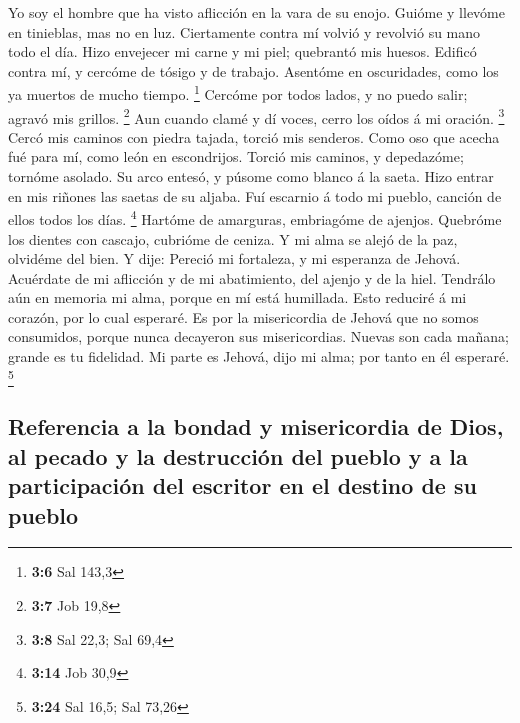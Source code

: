  Yo soy el hombre que ha visto aflicción en la vara de su
enojo.  Guióme y llevóme en tinieblas, mas no en luz.
 Ciertamente contra mí volvió y revolvió su mano todo el
día.  Hizo envejecer mi carne y mi piel; quebrantó mis
huesos.  Edificó contra mí, y cercóme de tósigo y de
trabajo.  Asentóme en oscuridades, como los ya muertos de
mucho tiempo. \footnote{\textbf{3:6} Sal 143,3}  Cercóme por
todos lados, y no puedo salir; agravó mis grillos. \footnote{\textbf{3:7}
  Job 19,8}  Aun cuando clamé y dí voces, cerro los oídos á
mi oración. \footnote{\textbf{3:8} Sal 22,3; Sal 69,4} 
Cercó mis caminos con piedra tajada, torció mis senderos. 
Como oso que acecha fué para mí, como león en escondrijos. 
Torció mis caminos, y depedazóme; tornóme asolado.  Su arco
entesó, y púsome como blanco á la saeta.  Hizo entrar en
mis riñones las saetas de su aljaba.  Fuí escarnio á todo
mi pueblo, canción de ellos todos los días. \footnote{\textbf{3:14} Job
  30,9}  Hartóme de amarguras, embriagóme de ajenjos.
 Quebróme los dientes con cascajo, cubrióme de ceniza.
 Y mi alma se alejó de la paz, olvidéme del bien.
 Y dije: Pereció mi fortaleza, y mi esperanza de Jehová.
 Acuérdate de mi aflicción y de mi abatimiento, del ajenjo
y de la hiel.  Tendrálo aún en memoria mi alma, porque en
mí está humillada.  Esto reduciré á mi corazón, por lo cual
esperaré.  Es por la misericordia de Jehová que no somos
consumidos, porque nunca decayeron sus misericordias. 
Nuevas son cada mañana; grande es tu fidelidad.  Mi parte
es Jehová, dijo mi alma; por tanto en él esperaré. \footnote{\textbf{3:24}
  Sal 16,5; Sal 73,26}

\hypertarget{referencia-a-la-bondad-y-misericordia-de-dios-al-pecado-y-la-destrucciuxf3n-del-pueblo-y-a-la-participaciuxf3n-del-escritor-en-el-destino-de-su-pueblo}{%
\subsection{Referencia a la bondad y misericordia de Dios, al pecado y
la destrucción del pueblo y a la participación del escritor en el
destino de su
pueblo}\label{referencia-a-la-bondad-y-misericordia-de-dios-al-pecado-y-la-destrucciuxf3n-del-pueblo-y-a-la-participaciuxf3n-del-escritor-en-el-destino-de-su-pueblo}}


